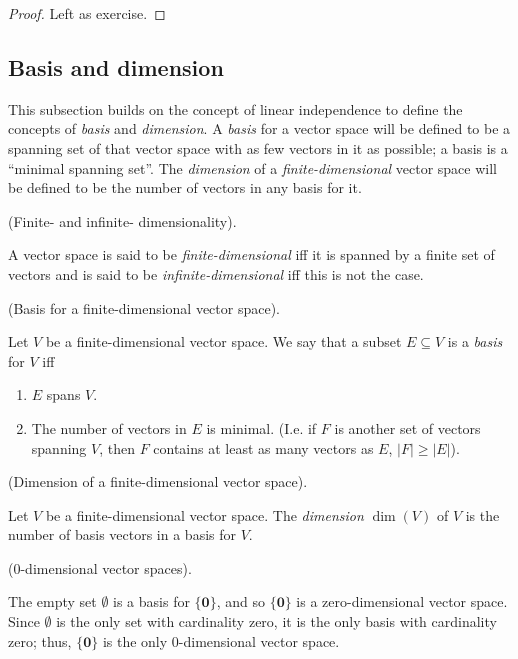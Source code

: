 \begin{proof}
   Left as exercise.
\end{proof}


\newpage

\subsection*{Basis and dimension}

This subsection builds on the concept of linear independence to define the concepts of \textit{basis} and \textit{dimension}. A \textit{basis} for a vector space will be defined to be a spanning set of that vector space with as few vectors in it as possible; a basis is a ``minimal spanning set''. The \textit{dimension} of a \textit{finite-dimensional} vector space will be defined to be the number of vectors in any basis for it.

\begin{defn}
    (Finite- and infinite- dimensionality).
    
    A vector space is said to be \textit{finite-dimensional} iff it is spanned by a finite set of vectors and is said to be \textit{infinite-dimensional} iff this is not the case.
\end{defn}

\begin{defn}
    (Basis for a finite-dimensional vector space). 
    
    Let $V$ be a finite-dimensional vector space. We say that a subset $E \subseteq V$ is a \textit{basis} for $V$ iff
    
    \begin{enumerate}
        \item $E$ spans $V$.
        \item The number of vectors in $E$ is minimal. (I.e. if $F$ is another set of vectors spanning $V$, then $F$ contains at least as many vectors as $E$, $|F| \geq |E|$).
    \end{enumerate}
\end{defn}

\begin{defn}
    (Dimension of a finite-dimensional vector space).
    
    Let $V$ be a finite-dimensional vector space. The \textit{dimension} $\dim(V)$ of $V$ is the number of basis vectors in a basis for $V$.
\end{defn}

\begin{remark}
    ($0$-dimensional vector spaces). 
    
    The empty set $\emptyset$ is a basis for $\{\mathbf{0}\}$, and so $\{\mathbf{0}\}$ is a zero-dimensional vector space. Since $\emptyset$ is the only set with cardinality zero, it is the only basis with cardinality zero; thus, $\{\mathbf{0}\}$ is the only $0$-dimensional vector space.
\end{remark}

